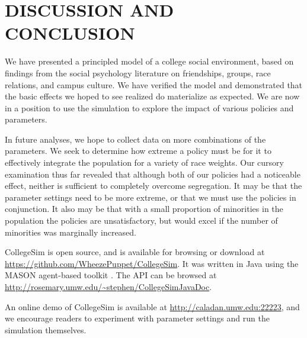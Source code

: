 
\section{DISCUSSION AND CONCLUSION}
\label{sec:discussion}

We have presented a principled model of a college social environment, based on
findings from the social psychology literature on friendships, groups, race
relations, and campus culture. We have verified the model and demonstrated
that the basic effects we hoped to see realized do materialize as expected. We
are now in a position to use the simulation to explore the impact of various
policies and parameters.

In future analyses, we hope to collect data on more combinations of the
parameters. We seek to determine how extreme a policy must be for it to
effectively integrate the population for a variety of race weights. Our
cursory examination thus far revealed that although both of our policies had a
noticeable effect, neither is sufficient to completely overcome segregation.
It may be that the parameter settings need to be more extreme, or that we must
use the policies in conjunction. It also may be that with a small proportion
of minorities in the population the policies are unsatisfactory, but would
excel if the number of minorities was marginally increased. 

CollegeSim is open source, and is available for browsing or download at
\url{https://github.com/WheezePuppet/CollegeSim}. It was written in Java
using the MASON agent-based toolkit \cite{luke_mason:_2005}. The API can be
browsed at \url{http://rosemary.umw.edu/~stephen/CollegeSimJavaDoc}.

An online demo of CollegeSim is available at
\url{http://caladan.umw.edu:22223}, and we encourage readers to experiment
with parameter settings and run the simulation themselves.


